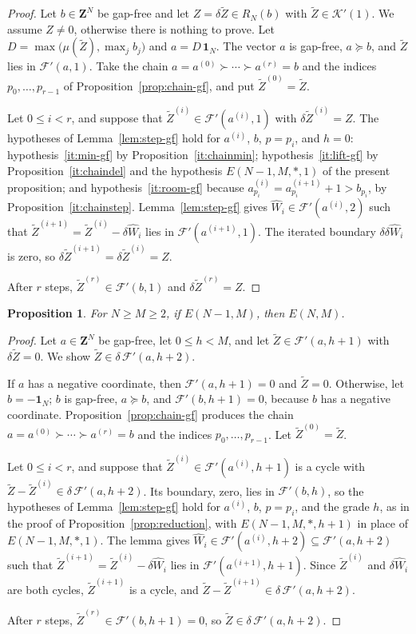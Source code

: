 \documentclass[12pt]{amsart}
\newtheorem{proposition}[theorem]{Proposition}
\theoremstyle{definition}
\theoremstyle{remark}
\newcommand{\Z}{\mathbf Z}
\newcommand{\TZ}{\tilde Z}
\newcommand{\K}{\mathcal K}
\newcommand{\FF}{\mathcal F}
\newcommand{\LL}{\mathcal K} %
\newcommand{\One}{\mathbf{1}}
\begin{document}
\begin{proof}
Let $b \in \Z^N$ be gap-free 
and let $Z=\delta\TZ\in R_N(b)$ with $\TZ\in\LL'(1)$.
We assume $Z \ne 0$, otherwise there is nothing to prove.
Let $D=\max\bigl( \mu(\TZ), \max_j b_j \bigr)$ and
$a=D\, \One_{N}$.  
The vector $a$ is gap-free, $a \succeq b$, and
$\TZ$ lies in $\FF'(a, 1)$.
Take the chain $a=a^{(0)}\succ\cdots\succ a^{(r)}=b$ and the indices
$p_0,\ldots,p_{r-1}$ of Proposition~\ref{prop:chain-gf}, and put $\TZ^{(0)}=\TZ$.

\smallskip
Let $0\le i<r$, and suppose that
$\TZ^{(i)}\in \FF'(a^{(i)}, 1)$ with $\delta\TZ^{(i)}=Z$.
The hypotheses of Lemma~\ref{lem:step-gf} hold
for $a^{(i)}$, $b$, $p=p_i$, and $h=0$: hypothesis~\ref{it:min-gf} by
Proposition~\ref{it:chainmin}; hypothesis~\ref{it:lift-gf} by
Proposition~\ref{it:chaindel} and the hypothesis $E(N-1,M,*,1)$ of the present
proposition; and hypothesis~\ref{it:room-gf}
because $a^{(i)}_{p_i}=a^{(i+1)}_{p_i}+1>b_{p_i}$, by
Proposition~\ref{it:chainstep}.
Lemma~\ref{lem:step-gf} gives $\widehat W_i\in\FF'(a^{(i)}, 2)$ such that
$\TZ^{(i+1)}=\TZ^{(i)}-\delta\widehat W_i$ lies in $\FF'(a^{(i+1)}, 1)$.
The iterated boundary $\delta\delta \widehat W_i$ is zero, so
$\delta\TZ^{(i+1)}=\delta\TZ^{(i)}=Z$.

After $r$ steps, $\TZ^{(r)}\in \FF'(b, 1)$ and $\delta\TZ^{(r)}=Z$.
\end{proof}


\begin{proposition}\label{prop:Ereduction}
For $N \geq M \geq 2$, if $E(N-1, M)$, then $E(N, M)$.
\end{proposition}
\begin{proof}
Let $a\in\Z^N$ be gap-free, let $0\le h < M$, and let $\TZ\in\FF'(a,h+1)$
with $\delta\TZ=0$.  We show $\TZ\in\delta\,\FF'(a,h+2)$.

If $a$ has a negative coordinate, then $\FF'(a,h+1)=0$ and $\TZ=0$.
Otherwise, let $b=-\One_N$;  $b$ is gap-free, $a\succeq b$, and
$\FF'(b,h+1)=0$, because $b$ has a negative coordinate.
Proposition~\ref{prop:chain-gf} produces the chain $a=a^{(0)}\succ\cdots\succ a^{(r)}=b$
and the indices $p_0,\ldots,p_{r-1}$.
Let $\TZ^{(0)}=\TZ$.

Let $0\le i<r$, and suppose that $\TZ^{(i)}\in\FF'(a^{(i)},h+1)$ is a cycle
with $\TZ-\TZ^{(i)}\in\delta\,\FF'(a,h+2)$.  Its boundary, zero, lies in
$\FF'(b,h)$, so the hypotheses of Lemma~\ref{lem:step-gf} hold for
$a^{(i)}$, $b$, $p=p_i$, and the grade $h$, as in the proof of
Proposition~\ref{prop:reduction}, with $E(N-1,M,*,h+1)$ in place of $E(N-1,M,*,1)$.  The lemma gives
$\widehat W_i\in\FF'(a^{(i)},h+2)\subseteq\FF'(a,h+2)$ such that
$\TZ^{(i+1)}=\TZ^{(i)}-\delta\widehat W_i$ lies in $\FF'(a^{(i+1)},h+1)$.  
Since $\TZ^{(i)}$ and $\delta\widehat W_i$ are both cycles, $\TZ^{(i+1)}$
is a cycle, and $\TZ-\TZ^{(i+1)}\in\delta\,\FF'(a,h+2)$.

After $r$ steps, $\TZ^{(r)}\in\FF'(b,h+1)=0$, so $\TZ\in\delta\,\FF'(a,h+2)$.
\end{proof}
\end{document}

